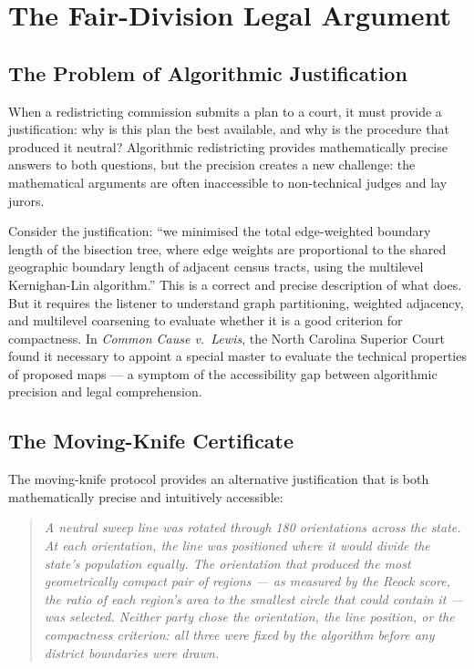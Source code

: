 \section{The Fair-Division Legal Argument}
\label{sec:fair-division}

\subsection{The Problem of Algorithmic Justification}

When a redistricting commission submits a plan to a court, it must provide
a justification: why is this plan the best available, and why is the procedure
that produced it neutral?
Algorithmic redistricting provides mathematically precise answers to both
questions, but the precision creates a new challenge: the mathematical
arguments are often inaccessible to non-technical judges and lay jurors.

Consider the \metis{} justification: ``we minimised the total edge-weighted
boundary length of the bisection tree, where edge weights are proportional to
the shared geographic boundary length of adjacent census tracts, using the
multilevel Kernighan-Lin algorithm.''
This is a correct and precise description of what \metis{} does.
But it requires the listener to understand graph partitioning, weighted
adjacency, and multilevel coarsening to evaluate whether it is a good criterion
for compactness.
In \textit{Common Cause v.\ Lewis}, the North Carolina Superior Court
found it necessary to appoint a special master to evaluate the technical
properties of proposed maps --- a symptom of the accessibility gap between
algorithmic precision and legal comprehension.

\subsection{The Moving-Knife Certificate}

The moving-knife protocol provides an alternative justification that is both
mathematically precise and intuitively accessible:

\begin{quote}
\textit{A neutral sweep line was rotated through 180 orientations across the
state.
At each orientation, the line was positioned where it would divide the
state's population equally.
The orientation that produced the most geometrically compact pair of
regions --- as measured by the Reock score, the ratio of each region's
area to the smallest circle that could contain it --- was selected.
Neither party chose the orientation, the line position, or the compactness
criterion: all three were fixed by the algorithm before any district
boundaries were drawn.}
\end{quote}

